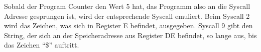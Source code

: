 Sobald der Program Counter den Wert 5 hat, das Programm also an die Syscall Adresse gesprungen ist, wird der entsprechende Syscall emuliert. Beim Syscall 2 wird das Zeichen, was sich in Register E befindet, ausgegeben. Syscall 9 gibt den String, der sich an der Speicheradresse aus Register DE befindet, so lange aus, bis das Zeichen \enquote{\$} auftritt.